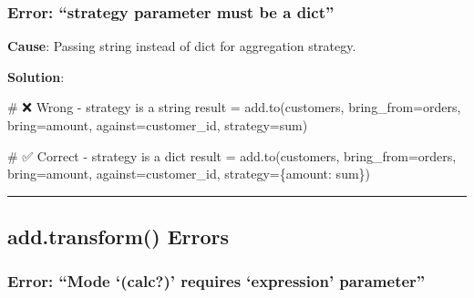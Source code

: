 \documentclass[
  letterpaper,
]{scrbook}
\newenvironment{Shaded}{\begin{snugshade}}{\end{snugshade}}
\newcommand{\CommentTok}[1]{\textcolor[rgb]{0.37,0.37,0.37}{#1}}
\newcommand{\NormalTok}[1]{\textcolor[rgb]{0.00,0.23,0.31}{#1}}
\newcommand{\OperatorTok}[1]{\textcolor[rgb]{0.37,0.37,0.37}{#1}}
\newcommand{\StringTok}[1]{\textcolor[rgb]{0.13,0.47,0.30}{#1}}
\begin{document}
\subsubsection{Error: ``strategy parameter must be a
dict''}\label{error-strategy-parameter-must-be-a-dict}

\textbf{Cause}: Passing string instead of dict for aggregation strategy.

\textbf{Solution}:

\begin{Shaded}
\begin{Highlighting}[]
\CommentTok{\# ❌ Wrong {-} strategy is a string}
\NormalTok{result }\OperatorTok{=}\NormalTok{ add.to(customers, bring\_from}\OperatorTok{=}\NormalTok{orders, bring}\OperatorTok{=}\StringTok{\textquotesingle{}amount\textquotesingle{}}\NormalTok{, }
\NormalTok{                against}\OperatorTok{=}\StringTok{\textquotesingle{}customer\_id\textquotesingle{}}\NormalTok{, strategy}\OperatorTok{=}\StringTok{\textquotesingle{}sum\textquotesingle{}}\NormalTok{)}

\CommentTok{\# ✅ Correct {-} strategy is a dict}
\NormalTok{result }\OperatorTok{=}\NormalTok{ add.to(customers, bring\_from}\OperatorTok{=}\NormalTok{orders, bring}\OperatorTok{=}\StringTok{\textquotesingle{}amount\textquotesingle{}}\NormalTok{, }
\NormalTok{                against}\OperatorTok{=}\StringTok{\textquotesingle{}customer\_id\textquotesingle{}}\NormalTok{, strategy}\OperatorTok{=}\NormalTok{\{}\StringTok{\textquotesingle{}amount\textquotesingle{}}\NormalTok{: }\StringTok{\textquotesingle{}sum\textquotesingle{}}\NormalTok{\})}
\end{Highlighting}
\end{Shaded}

\begin{center}\rule{0.5\linewidth}{0.5pt}\end{center}

\subsection{add.transform() Errors}\label{add.transform-errors}

\subsubsection{\texorpdfstring{Error: ``Mode `(\textbf{calc?})' requires
`expression'
parameter''}{Error: ``Mode `(calc?)' requires `expression' parameter''}}\label{error-mode-calc-requires-expression-parameter}
\end{document}
